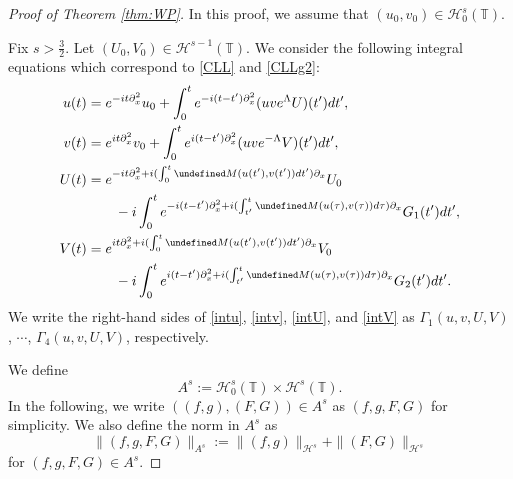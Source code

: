 \documentclass[%
11pt,  reqno]{amsart}
\newcommand{\T}{\mathbb{T}}
\renewcommand{\H}{\mathcal H}
\newcommand{\G}{\Gamma}
\newcommand{\Ld}{\Lambda}
\newcommand{\dx}{\partial_x}
\numberwithin{equation}{section}
\numberwithin{theorem}{section}
\let\Im=\undefined\DeclareMathOperator*{\Im}{Im}
\begin{document}
\begin{proof}[Proof of Theorem \ref{thm:WP}]
In this proof, we assume that $(u_0, v_0) \in \H_0^s(\T)$.

Fix $s > \frac 32$. Let $(U_0, V_0) \in \H^{s-1}(\T)$.
We consider the following integral equations which correspond to \eqref{CLL} and \eqref{CLLg2}:
\begin{align}
u(t) &= e^{- i t \dx^2} u_0 
+ \int_0^t e^{- i (t - t') \dx^2} (u v e^{\Ld} U) (t')  dt',
\label{intu}
\\
v(t) &= e^{i t \dx^2} v_0 
+ \int_0^t e^{i (t - t') \dx^2} (u v e^{-\Ld} V) (t')  dt',
\label{intv}
\\
U(t) &= e^{- i t \dx^2 + i (\int_0^t \Im M(u(t'), v(t')) dt') \dx} U_0 
\notag
\\
&\qquad- 
i \int_0^t e^{- i (t - t') \dx^2 + i (\int_{t'}^t \Im M(u(\tau), v(\tau)) d\tau) \dx} G_1(t') dt',
\label{intU}
\\
V(t) &= e^{ i t \dx^2 + i (\int_0^t \Im M(u(t'), v(t')) dt') \dx} V_0
\notag 
\\
&\qquad- 
i \int_0^t e^{i (t - t') \dx^2 + i (\int_{t'}^t \Im M(u(\tau), v(\tau)) d\tau) \dx} G_2(t') dt'.
\label{intV}
\end{align}
We write the right-hand sides of \eqref{intu}, \eqref{intv}, \eqref{intU}, and \eqref{intV} as
$\G_1(u,v,U,V)$, $\cdots$, $\G_4(u,v,U,V)$, respectively.

We define
\[
A^s := \H_0^s(\T) \times \H^s(\T).
\]
In the following,
we write $((f, g), (F, G)) \in A^s$ as $(f,g,F,G)$ for simplicity.
We also define the norm in $A^s$ as
\[
\|(f, g, F, G)\|_{A^s} := \|(f, g) \|_{\H^s} + \|(F, G)\|_{\H^s}
\]
for $(f,g,F,G) \in A^s$.


\end{proof}
\end{document}
